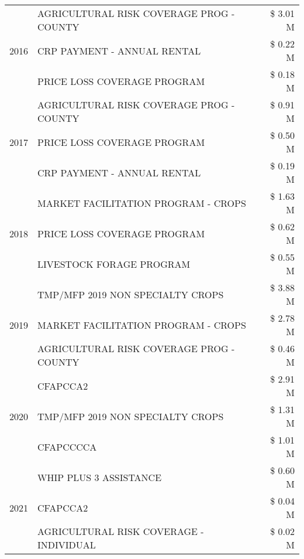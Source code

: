\begin{tabular}{llr}
\cline{1-3}
\multirow[t]{3}{*}{2016} & AGRICULTURAL RISK COVERAGE PROG - COUNTY & \$ 3.01 M \\
 & CRP PAYMENT - ANNUAL RENTAL & \$ 0.22 M \\
 & PRICE LOSS COVERAGE PROGRAM & \$ 0.18 M \\
\cline{1-3}
\multirow[t]{3}{*}{2017} & AGRICULTURAL RISK COVERAGE PROG - COUNTY & \$ 0.91 M \\
 & PRICE LOSS COVERAGE PROGRAM & \$ 0.50 M \\
 & CRP PAYMENT - ANNUAL RENTAL & \$ 0.19 M \\
\cline{1-3}
\multirow[t]{3}{*}{2018} & MARKET FACILITATION PROGRAM - CROPS & \$ 1.63 M \\
 & PRICE LOSS COVERAGE PROGRAM & \$ 0.62 M \\
 & LIVESTOCK FORAGE PROGRAM & \$ 0.55 M \\
\cline{1-3}
\multirow[t]{3}{*}{2019} & TMP/MFP 2019 NON SPECIALTY CROPS & \$ 3.88 M \\
 & MARKET FACILITATION PROGRAM - CROPS & \$ 2.78 M \\
 & AGRICULTURAL RISK COVERAGE PROG - COUNTY & \$ 0.46 M \\
\cline{1-3}
\multirow[t]{3}{*}{2020} & CFAPCCA2 & \$ 2.91 M \\
 & TMP/MFP 2019 NON SPECIALTY CROPS & \$ 1.31 M \\
 & CFAPCCCCA & \$ 1.01 M \\
\cline{1-3}
\multirow[t]{3}{*}{2021} & WHIP PLUS 3 ASSISTANCE & \$ 0.60 M \\
 & CFAPCCA2 & \$ 0.04 M \\
 & AGRICULTURAL RISK COVERAGE - INDIVIDUAL & \$ 0.02 M \\
\cline{1-3}
\bottomrule
\end{tabular}
